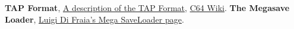 \renewcommand{\bibname}{Notes \&\ References}
\begin{thebibliography}{999}


  \textbf{TAP Format},
  \href{http://unusedino.de/ec64/technical/formats/tap.html}{A description of the TAP Format},
  \href{https://www.c64-wiki.com/wiki/TAP}{C64 Wiki}.
  \textbf{The Megasave Loader},
  \href{https://www.luigidifraia.com/doku/doku.php?id=commodore:tapes:loaders:mega-save}{Luigi Di Fraia's Mega SaveLoader page}.



\end{thebibliography}
